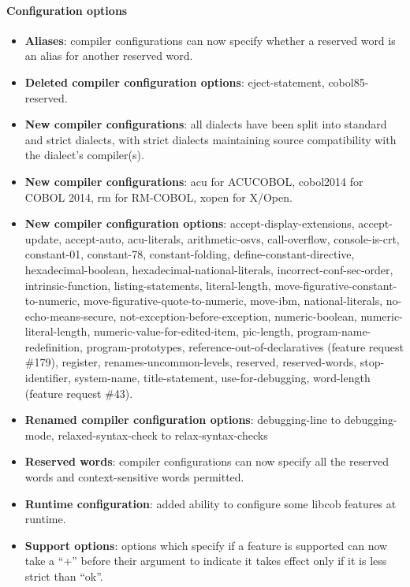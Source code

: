 \paragraph{Configuration options}
\begin{itemize}
\item \textbf{Aliases}: compiler configurations can now specify whether a reserved word is an alias for another reserved word.
\item \textbf{Deleted compiler configuration options}: eject-statement, cobol85-reserved.
\item \textbf{New compiler configurations}: all dialects have been split into standard and strict dialects, with strict dialects maintaining source compatibility with the dialect's compiler(s).
\item \textbf{New compiler configurations}: acu for ACUCOBOL, cobol2014 for COBOL 2014, rm for RM-COBOL, xopen for X\slash{}Open.
\item \textbf{New compiler configuration options}: accept-display-extensions, accept-update, accept-auto, acu-literals, arithmetic-osvs, call-overflow, console-is-crt, constant-01, constant-78, constant-folding, define-constant-directive, hexadecimal-boolean, hexadecimal-national-literals, incorrect-conf-sec-order, intrinsic-function, listing-statements, literal-length, move-figurative-constant-to-numeric, move-figurative-quote-to-numeric, move-ibm, national-literals, no-echo-means-secure, not-exception-before-exception, numeric-boolean, numeric-literal-length, numeric-value-for-edited-item, pic-length, program-name-redefinition, program-prototypes, reference-out-of-declaratives (feature request \#179), register, renames-uncommon-levels, reserved, reserved-words, stop-identifier, system-name, title-statement, use-for-debugging, word-length (feature request \#43).
\item \textbf{Renamed compiler configuration options}: debugging-line to debugging-mode, relaxed-syntax-check to relax-syntax-checks
\item \textbf{Reserved words}: compiler configurations can now specify all the reserved words and context-sensitive words permitted.
\item \textbf{Runtime configuration}: added ability to configure some libcob features at runtime.
\item \textbf{Support options}: options which specify if a feature is supported can now take a ``+'' before their argument to indicate it takes effect only if it is less strict than ``ok''.
\end{itemize}

